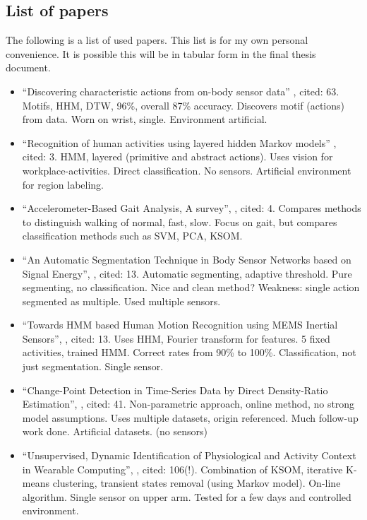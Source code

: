 
\subsection{List of papers}
The following is a list of used papers.
This list is for my own personal convenience.
It is possible this will be in tabular form in the final thesis document.
\begin{itemize}
  \item ``Discovering characteristic actions from on-body sensor data'' \cite{minnen2006discovering}, cited: 63. Motifs, HHM, DTW, 96\%, overall 87\% accuracy. Discovers motif (actions) from data. Worn on wrist, single. Environment artificial.
  \item ``Recognition of human activities using layered hidden Markov models'' \cite{perdikis2008recognition}, cited: 3. HMM, layered (primitive and abstract actions). Uses vision for workplace-activities. Direct classification. No sensors. Artificial environment for region labeling.
  \item ``Accelerometer-Based Gait Analysis, A survey'', \cite{derawi2010accelerometer}, cited: 4. Compares methods to distinguish walking of normal, fast, slow. Focus on gait, but compares classification methods such as SVM, PCA, KSOM.
  \item ``An Automatic Segmentation Technique in Body Sensor Networks based on Signal Energy'', \cite{guenterberg2009automatic}, cited: 13. Automatic segmenting, adaptive threshold. Pure segmenting, no classification. Nice and clean method? Weakness: single action segmented as multiple. Used multiple sensors.
  \item ``Towards HMM based Human Motion Recognition using MEMS Inertial Sensors'', \cite{shi2009towards}, cited: 13. Uses HHM, Fourier transform for features. 5 fixed activities, trained HMM. Correct rates from 90\% to 100\%. Classification, not just segmentation. Single sensor.
  \item ``Change-Point Detection in Time-Series Data by Direct Density-Ratio Estimation'', \cite{kawahara2009change}, cited: 41. Non-parametric approach, online method, no strong model assumptions. Uses multiple datasets, origin referenced. Much follow-up work done. Artificial datasets. (no sensors)
  \item ``Unsupervised, Dynamic Identification of Physiological and Activity Context in Wearable Computing'', \cite{krause2003unsupervised}, cited: 106(!). Combination of KSOM, iterative K-means clustering, transient states removal (using Markov model). On-line algorithm. Single sensor on upper arm. Tested for a few days and controlled environment.

\end{itemize}
